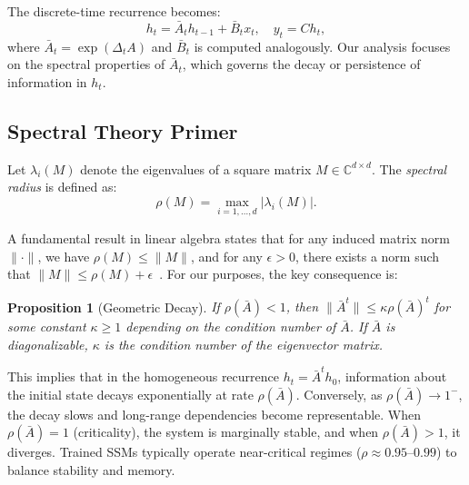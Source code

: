 \documentclass[10pt,twocolumn]{article}
\newtheorem{proposition}{Proposition}
\begin{document}
The discrete-time recurrence becomes:
\begin{equation}
    h_t = \bar{A}_t h_{t-1} + \bar{B}_t x_t, \quad y_t = C h_t,
    \label{eq:dts_update}
\end{equation}
where $\bar{A}_t = \exp(\Delta_t A)$ and $\bar{B}_t$ is computed analogously. Our analysis focuses on the spectral properties of $\bar{A}_t$, which governs the decay or persistence of information in $h_t$.

\subsection{Spectral Theory Primer}

Let $\lambda_i(M)$ denote the eigenvalues of a square matrix $M\in\mathbb{C}^{d\times d}$. The \emph{spectral radius} is defined as:
\begin{equation}
    \rho(M) = \max_{i=1,\dots,d} |\lambda_i(M)|.
    \label{eq:spectral_radius_def}
\end{equation}

A fundamental result in linear algebra states that for any induced matrix norm $\|\cdot\|$, we have $\rho(M) \le \|M\|$, and for any $\epsilon>0$, there exists a norm such that $\|M\| \le \rho(M) + \epsilon$~\cite{horn2012matrix}. For our purposes, the key consequence is:

\begin{proposition}[Geometric Decay]
If $\rho(\bar{A})<1$, then $\|\bar{A}^t\| \le \kappa \rho(\bar{A})^t$ for some constant $\kappa\ge 1$ depending on the condition number of $\bar{A}$. If $\bar{A}$ is diagonalizable, $\kappa$ is the condition number of the eigenvector matrix.
\end{proposition}

This implies that in the homogeneous recurrence $h_t = \bar{A}^t h_0$, information about the initial state decays exponentially at rate $\rho(\bar{A})$. Conversely, as $\rho(\bar{A})\to 1^{-}$, the decay slows and long-range dependencies become representable. When $\rho(\bar{A})=1$ (criticality), the system is marginally stable, and when $\rho(\bar{A})>1$, it diverges. Trained SSMs typically operate near-critical regimes ($\rho\approx 0.95$--$0.99$) to balance stability and memory.
\end{document}
